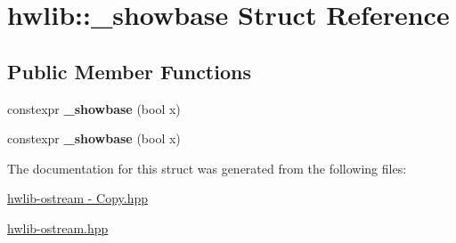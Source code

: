 \hypertarget{structhwlib_1_1__showbase}{}\section{hwlib\+:\+:\+\_\+showbase Struct Reference}
\label{structhwlib_1_1__showbase}
\subsection*{Public Member Functions}
\begin{DoxyCompactItemize}
\item 
constexpr {\bfseries \+\_\+showbase} (bool x)\hypertarget{structhwlib_1_1__showbase_aa9dd5a4b597e34ae374859798a7a3c2d}{}\label{structhwlib_1_1__showbase_aa9dd5a4b597e34ae374859798a7a3c2d}

\item 
constexpr {\bfseries \+\_\+showbase} (bool x)\hypertarget{structhwlib_1_1__showbase_aa9dd5a4b597e34ae374859798a7a3c2d}{}\label{structhwlib_1_1__showbase_aa9dd5a4b597e34ae374859798a7a3c2d}

\end{DoxyCompactItemize}


The documentation for this struct was generated from the following files\+:\begin{DoxyCompactItemize}
\item 
\hyperlink{hwlib-ostream_01-_01_copy_8hpp}{hwlib-\/ostream -\/ Copy.\+hpp}\item 
\hyperlink{hwlib-ostream_8hpp}{hwlib-\/ostream.\+hpp}\end{DoxyCompactItemize}
